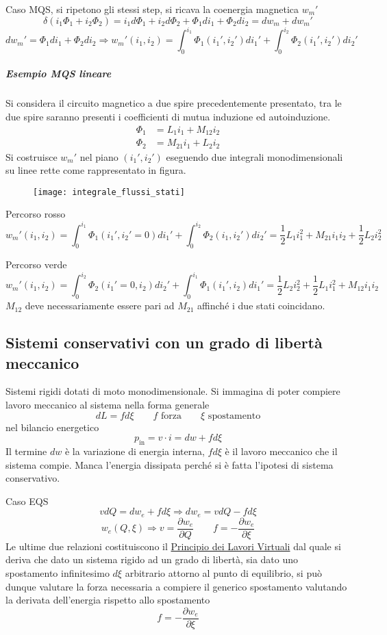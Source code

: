 Caso MQS, si ripetono gli stessi step, si ricava la coenergia magnetica $w_m'$
$$
\delta(i_1\Phi_1 + i_2\Phi_2) = i_1d\Phi_1 + i_2d\Phi_2 + \Phi_1di_1 + \Phi_2di_2 = dw_m + dw_m'
$$
$$
dw_m' = \Phi_1di_1 + \Phi_2di_2 \Rightarrow w_m'(i_1,i_2) = \int_0^{i_1} \Phi_1(i_1',i_2')di_1' + \int_0^{i_2} \Phi_2(i_1',i_2')di_2'
$$
\subparagraph{Esempio MQS lineare}
Si considera il circuito magnetico a due spire precedentemente presentato, tra le due spire saranno
presenti i coefficienti di mutua induzione ed autoinduzione.
$$\begin{aligned}
\Phi_1 &= L_1i_1 + M_{12}i_2\\
\Phi_2 &= M_{21}i_1 + L_2i_2
\end{aligned}
$$
Si costruisce $w_m'$ nel piano $(i_1',i_2')$ eseguendo due integrali monodimensionali su linee rette come
rappresentato in figura.
\begin{figure}[H]
\centering
\texttt{[image: integrale\_flussi\_stati]}
\end{figure}
Percorso rosso
$$
w_m'(i_1,i_2) = \int_0^{i_1}\Phi_1(i_1',i_2'=0) di_1' + \int_0^{i_2} \Phi_2(i_1,i_2')di_2' = \frac{1}{2}L_1i_1^2 + M_{21}i_1i_2 + \frac{1}{2}L_2i_2^2
$$

Percorso verde
$$
w_m'(i_1,i_2) = \int_0^{i_2}\Phi_2(i_1'=0,i_2)di_2' + \int_0^{i_1}\Phi_1(i_1',i_2)di_1' = \frac{1}{2}L_2i_2^2 + \frac{1}{2}L_1i_1^2 + M_{12}i_1i_2
$$
$M_{12}$ deve necessariamente essere pari ad $M_{21}$ affinché i due stati coincidano.
\newpage

\subsection{Sistemi conservativi con un grado di libertà meccanico}
Sistemi rigidi dotati di moto monodimensionale.
Si immagina di poter compiere lavoro meccanico al sistema nella forma generale
$$
dL = fd\xi \qquad f\text{ forza}\qquad \xi \text{ spostamento}
$$
nel bilancio energetico
$$
p_\text{in} = v\cdot i = dw + fd\xi
$$
Il termine $dw$ è la variazione di energia interna, $fd\xi$ è il lavoro meccanico che il sistema compie. Manca 
l'energia dissipata perché si è fatta l'ipotesi di sistema conservativo.

Caso EQS
$$
vdQ = dw_e + fd\xi \Rightarrow dw_e = vdQ - fd\xi
$$
$$
w_e(Q,\xi) \Rightarrow v= \frac{\partial w_e}{\partial Q}\qquad f=-\frac{\partial w_e}{\partial \xi}
$$
Le ultime due relazioni costituiscono il \href{https://it.wikipedia.org/wiki/Teorema_dei_lavori_virtuali}{Principio dei Lavori Virtuali} dal quale si deriva che dato un sistema rigido ad un grado di libertà, sia dato uno
spostamento infinitesimo $d\xi$ arbitrario attorno al punto di equilibrio, si può dunque valutare la forza
necessaria a compiere il generico spostamento valutando la derivata dell'energia rispetto allo spostamento
$$
f = -\frac{\partial w_e}{\partial \xi}
$$


